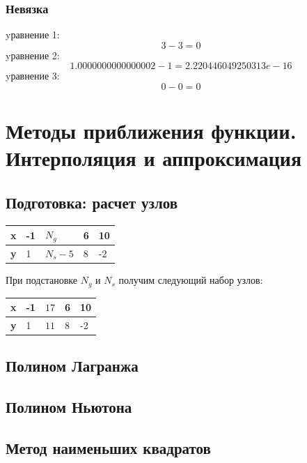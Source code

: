 \documentclass{article}
\begin{document}
\subsubsection{Невязка}
yравнение 1:
\begin{displaymath}
  3-3 = 0  
\end{displaymath}
yравнение 2:
\begin{displaymath}
  1.0000000000000002 - 1 = 2.220446049250313e-16
\end{displaymath}
yравнение 3:
\begin{displaymath}
  0 - 0 = 0
\end{displaymath}

\section{Методы приближения функции. Интерполяция и аппроксимация}

\subsection{Подготовка: расчет узлов}
\begin{table}[!h]
  \begin{tabular}{|l|l|l|l|l|}
  \hline
  \bfseries x & -1 & $N_{g}$   & 6 & 10\\
  \hline
  \bfseries y &  1 & $N_{s}-5$ & 8 & -2\\
  \hline
  \end{tabular}
\end{table}
При подстановке $N_{g}$ и $N_{s}$ получим следующий набор узлов:
\begin{table}[!h]
  \begin{tabular}{|l|l|l|l|l|}
  \hline
  \bfseries x & -1 & $17$ & 6 & 10\\
  \hline
  \bfseries y &  1 & $11$ & 8 & -2\\
  \hline
  \end{tabular}
\end{table}
 
\subsection{Полином Лагранжа}
\subsection{Полином Ньютона}
\subsection{Метод наименьших квадратов}
\end{document}
